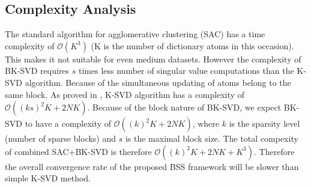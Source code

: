 \subsection{Complexity Analysis}
The standard algorithm for agglomerative clustering (SAC) has a time complexity of ${\displaystyle {\mathcal {O}}(K^{3})}$ (K is the number of dictionary atoms in this occasion). This makes it not suitable for even medium datasets. However the complexity of BK-SVD requires $s$ times less number of singular value computations than the K-SVD algorithm. Because of the simultaneous updating of atoms belong to the same block.
As proved in \cite{OMP_KSVD}, K-SVD algorithm has a complexity of $\displaystyle {\mathcal {O}}((ks)^2K + 2NK)$. Because of the block nature of BK-SVD, we expect BK-SVD to have a complexity of $\displaystyle {\mathcal {O}}((k)^2K + 2NK)$, where $k$ is the sparsity level (number of sparse blocks) and $s$ is the maximal block size. The total compexity of combined SAC+BK-SVD is therefore $\displaystyle {\mathcal {O}}((k)^2K + 2NK+K^3)$. Therefore the overall convergence rate of the proposed BSS framework will be slower than simple K-SVD method.\\

